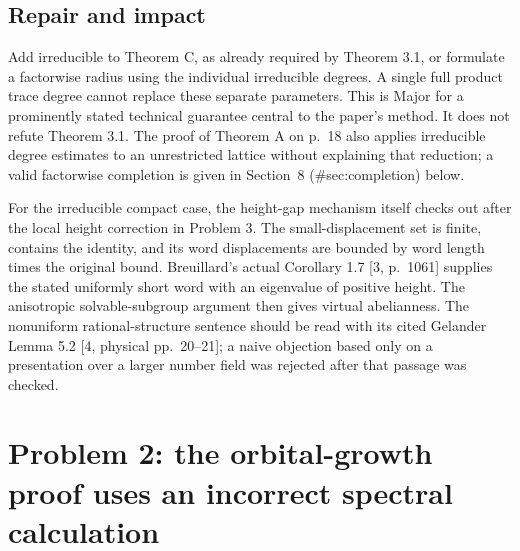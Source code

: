 \documentclass[10pt]{article}
\begin{document}
\subsection*{Repair and impact}
Add irreducible to Theorem C, as already required by Theorem 3.1, or formulate a factorwise radius using the individual irreducible degrees. A single full product trace degree cannot replace these separate parameters. This is Major for a prominently stated technical guarantee central to the paper’s method. It does not refute Theorem 3.1. The proof of Theorem A on p. 18 also applies irreducible degree estimates to an unrestricted lattice without explaining that reduction; a valid factorwise completion is given in Section 8 (\#sec:completion) below.\par
For the irreducible compact case, the height-gap mechanism itself checks out after the local height correction in Problem 3. The small-displacement set is finite, contains the identity, and its word displacements are bounded by word length times the original bound. Breuillard’s actual Corollary 1.7 [3, p. 1061] supplies the stated uniformly short word with an eigenvalue of positive height. The anisotropic solvable-subgroup argument then gives virtual abelianness. The nonuniform rational-structure sentence should be read with its cited Gelander Lemma 5.2 [4, physical pp. 20–21]; a naive objection based only on a presentation over a larger number field was rejected after that passage was checked.\par
\section*{Problem 2: the orbital-growth proof uses an incorrect spectral calculation}
\end{document}
